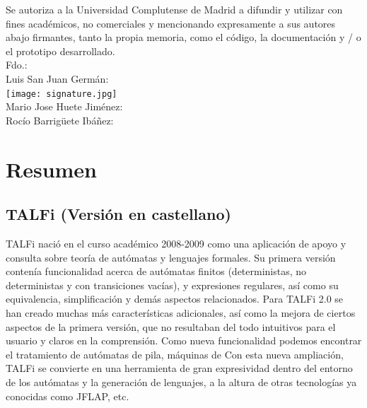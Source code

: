 \documentclass[12pt,a4paper,spanish]{book}
\begin{document}
Se autoriza a la Universidad Complutense de Madrid a difundir y utilizar con fines acad\'emicos, no comerciales y mencionando expresamente a sus autores abajo firmantes, tanto la propia memoria, como el c\'odigo, la documentaci\'on y / o el prototipo desarrollado.\\
\newline
\newline
Fdo.:\\
\newline
Luis San Juan Germ\'an:\\

\texttt{[image: signature.jpg]}\\


\noindent Mario Jose Huete Jim\'enez:\\
\newline
\newline
\newline
\newline
\newline
\newline
\newline
Roc\'io Barrig\"{u}ete Ib\'a\~nez:\\
\tableofcontents


\chapter{Resumen}
\section{TALFi (Versi\'on en castellano)}
TALFi naci\'o en el curso acad\'emico 2008-2009 como una aplicaci\'on de apoyo y consulta sobre teor\'ia de aut\'omatas y lenguajes formales.
Su primera versi\'on conten\'ia funcionalidad acerca de aut\'omatas finitos (deterministas, no deterministas y con transiciones vac\'ias), y expresiones regulares, as\'i como su equivalencia, simplificaci\'on y dem\'as aspectos relacionados.
Para TALFi 2.0 se han creado muchas m\'as caracter\'isticas adicionales, as\'i como la mejora de ciertos aspectos de la primera versi\'on, que no resultaban del todo intuitivos para el usuario y claros en la comprensi\'on.
Como nueva funcionalidad podemos encontrar el tratamiento de aut\'omatas de pila, m\'aquinas de 
Con esta nueva ampliaci\'on, TALFi se convierte en una herramienta de gran expresividad dentro del entorno de los aut\'omatas y la generaci\'on de lenguajes, a la altura de otras tecnolog\'ias ya conocidas como JFLAP, etc. 
\end{document}
